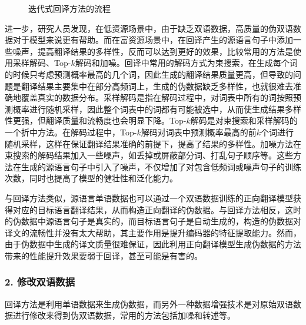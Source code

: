 \begin{figure}[htp]
\centering

\caption{迭代式回译方法的流程}
\label{fig:16-2}
\end{figure}

\parinterval 进一步，研究人员发现，在低资源场景中，由于缺乏双语数据，高质量的伪双语数据对于模型来说更有帮助。而在富资源场景中，在回译产生的源语言句子中添加一些噪声，提高翻译结果的多样性，反而可以达到更好的效果，比较常用的方法是使用采样解码、Top-$k$解码和加噪。回译中常用的解码方式为束搜索，在生成每个词的时候只考虑预测概率最高的几个词，因此生成的翻译结果质量更高，但导致的问题是翻译结果主要集中在部分高频词上，生成的伪数据缺乏多样性，也就很难去准确地覆盖真实的数据分布。采样解码是指在解码过程中，对词表中所有的词按照预测概率进行随机采样，因此整个词表中的词都有可能被选中，从而使生成结果多样性更强，但翻译质量和流畅度也会明显下降。Top-$k$解码是对束搜索和采样解码的一个折中方法。在解码过程中，Top-$k$解码对词表中预测概率最高的前$k$个词进行随机采样，这样在保证翻译结果准确的前提下，提高了结果的多样性。加噪方法在束搜索的解码结果加入一些噪声，如丢掉或屏蔽部分词、打乱句子顺序等。这些方法在生成的源语言句子中引入了噪声，不仅增加了对包含低频词或噪声句子的训练次数，同时也提高了模型的健壮性和泛化能力。

\parinterval 与回译方法类似，源语言单语数据也可以通过一个双语数据训练的正向翻译模型获得对应的目标语言翻译结果，从而构造正向翻译的伪数据。与回译方法相反，这时的伪数据中源语言句子是真实的，而目标语言句子是自动生成的，构造的伪数据对译文的流畅性并没有太大帮助，其主要作用是提升编码器的特征提取能力。然而，由于伪数据中生成的译文质量很难保证，因此利用正向翻译模型生成伪数据的方法带来的性能提升效果要弱于回译，甚至可能是有害的。

\subsubsection{2. 修改双语数据}

\parinterval 回译方法是利用单语数据来生成伪数据，而另外一种数据增强技术是对原始双语数据进行修改来得到伪双语数据，常用的方法包括加噪和转述等。

